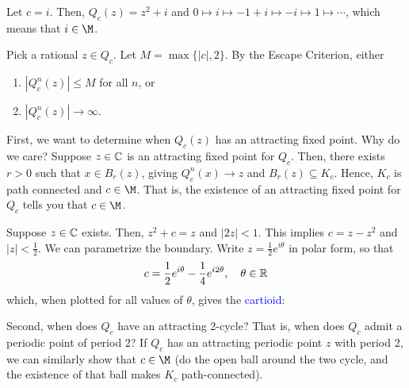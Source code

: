 \documentclass[class=pmath370,tikz,notes]{agony}
\begin{document}
\begin{example}
  Let $c = i$. Then, $Q_c(z) = z^2 + i$
  and $0 \mapsto i \mapsto -1+i \mapsto -i \mapsto 1 \mapsto \cdots$,
  which means that $i \in \M$.
\end{example}

\begin{remark}
  Pick a rational $z \in Q_c$. Let $M = \max\{|c|, 2\}$.
  By the Escape Criterion, either
  \begin{enumerate}[nosep]
    \item $|Q_c^n(z)| \leq M$ for all $n$, or
    \item $|Q_c^n(z)| \to \infty$.
  \end{enumerate}
\end{remark}

First, we want to determine when $Q_c(z)$ has an attracting fixed point.
Why do we care?
Suppose $z \in \mathbb{C}$ is an attracting fixed point for $Q_c$.
Then, there exists $r > 0$ such that $x \in B_r(z)$,
giving $Q_c^n(x) \to z$ and $B_r(z) \subseteq K_c$.
Hence, $K_c$ is path connected and $c \in \M$.
That is, the existence of an attracting fixed point for $Q_c$ tells you that $c \in \M$.

Suppose $z \in \mathbb{C}$ exists. Then, $z^2+c = z$ and $|2z| < 1$.
This implies $c = z-z^2$ and $|z| < \frac{1}{2}$.
We can parametrize the boundary.
Write $z = \frac{1}{2}e^{i \theta}$ in polar form, so that
\[ c = \frac{1}{2}e^{i \theta} - \frac{1}{4} e^{i 2\theta}\qc \theta \in \R \]
which, when plotted for all values of $\theta$, gives the \textcolor{blue}{cartioid}:
\begin{center}
\end{center}

Second, when does $Q_c$ have an attracting 2-cycle?
That is, when does $Q_c$ admit a periodic point of period 2?
If $Q_c$ has an attracting periodic point $z$ with period 2,
we can similarly show that $c \in \M$
(do the open ball around the two cycle,
and the existence of that ball makes $K_c$ path-connected).
\end{document}
